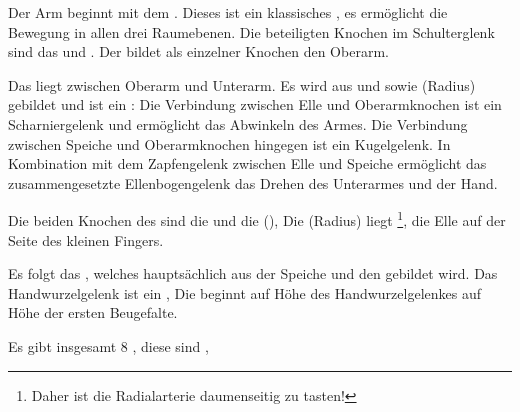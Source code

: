 {%
\label{topic:obere-extremitaet}%
Der Arm beginnt mit dem . 
%
Dieses ist ein klassisches , 
es ermöglicht die Bewegung in allen drei Raumebenen. 
%
Die beteiligten Knochen im Schulterglenk sind das 
  und
. 
%
Der   bildet als einzelner Knochen den 
Oberarm.

Das  liegt zwischen Oberarm und Unterarm. 
%
Es wird aus 
 und   sowie  (Radius) 
gebildet
und ist ein : 
%
Die Verbindung zwischen Elle und Oberarmknochen ist ein Scharniergelenk 
und ermöglicht das Abwinkeln des Armes. 
%
Die Verbindung zwischen Speiche und Oberarmknochen 
hingegen ist ein Kugelgelenk. 
%
In Kombination mit dem Zapfengelenk zwischen Elle und Speiche 
ermöglicht das zusammengesetzte Ellenbogengelenk
das Drehen des Unterarmes und der Hand. 

Die beiden Knochen des  sind die 
 und die  (), 
%
Die  (Radius) liegt \footnote{Daher
ist die Radialarterie daumenseitig zu tasten!}, 
die Elle auf der Seite des kleinen Fingers.

Es folgt das , welches hauptsächlich
aus der Speiche und den  gebildet wird.
Das Handwurzelgelenk ist ein , 
%
Die  beginnt auf Höhe des Handwurzelgelenkes auf Höhe der ersten 
Beugefalte.

Es gibt insgesamt 8 ,
diese sind , 

}
